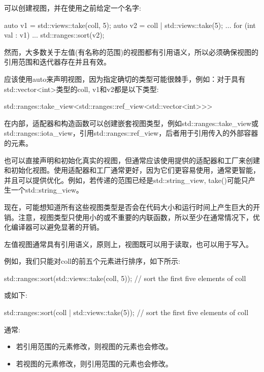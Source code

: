 
可以创建视图，并在使用之前给定一个名字:

\begin{cpp}
auto v1 = std::views::take(coll, 5);
auto v2 = coll | std::views::take(5);
...
for (int val : v1) {
	...
}
std::ranges::sort(v2);
\end{cpp}

然而，大多数关于左值(有名称的范围)的视图都有引用语义，所以必须确保视图的引用范围和迭代器存在并且有效。

应该使用auto来声明视图，因为指定确切的类型可能很棘手，例如：对于具有std::vector<int>类型的coll, v1和v2都是以下类型:

\begin{cpp}
std::ranges::take_view<std::ranges::ref_view<std::vector<int>>>
\end{cpp}

在内部，适配器和构造函数可以创建嵌套视图类型，例如std::ranges::take\_view或std::ranges::iota\_view，引用std::ranges::ref\_view，后者用于引用传入的外部容器的元素。

也可以直接声明和初始化真实的视图，但通常应该使用提供的适配器和工厂来创建和初始化视图。使用适配器和工厂通常更好，因为它们更容易使用，通常更智能，并且可以提供优化。例如，若传递的范围已经是std::string\_view, take()可能只产生一个std::string\_view。

现在，可能想知道所有这些视图类型是否会在代码大小和运行时间上产生巨大的开销。注意，视图类型只使用小的或不重要的内联函数，所以至少在通常情况下，优化编译器可以避免显著的开销。


左值视图通常具有引用语义，原则上，视图既可以用于读取，也可以用于写入。

例如，我们只能对coll的前五个元素进行排序，如下所示:

\begin{cpp}
std::ranges::sort(std::views::take(coll, 5)); // sort the first five elements of coll
\end{cpp}

或如下:

\begin{cpp}
std::ranges::sort(coll | std::views::take(5)); // sort the first five elements of coll
\end{cpp}

通常:

\begin{itemize}
\item
若引用范围的元素修改，则视图的元素也会修改。

\item
若视图的元素修改，则引用范围的元素也会修改。
\end{itemize}

